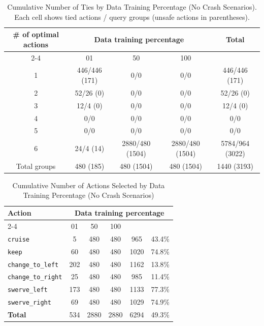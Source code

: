 \documentclass{article}
\begin{document}
\begin{table}[h]
\centering
\caption{Cumulative Number of Ties by Data Training Percentage (No Crash Scenarios).
Each cell shows tied actions / query groups (unsafe actions in parentheses).}
\begin{tabular}{c|ccc|c}
\toprule
\multirow{2}{*}{\# of optimal actions} & \multicolumn{3}{c|}{Data training percentage} & \multirow{2}{*}{Total} \\
\cmidrule{2-4}
 & 01 & 50 & 100 & \\
\midrule
1 & 446/446 (171) & 0/0 & 0/0 & 446/446 (171) \\ 
2 & 52/26 (0) & 0/0 & 0/0 & 52/26 (0) \\ 
3 & 12/4 (0) & 0/0 & 0/0 & 12/4 (0) \\ 
4 & 0/0 & 0/0 & 0/0 & 0/0 \\ 
5 & 0/0 & 0/0 & 0/0 & 0/0 \\ 
6 & 24/4 (14) & 2880/480 (1504) & 2880/480 (1504) & 5784/964 (3022) \\ 
\midrule
Total groups & 480 (185) & 480 (1504) & 480 (1504) & 1440 (3193) \\ 
\bottomrule
\end{tabular}
\end{table}

\begin{table}[h]
\centering
\caption{Cumulative Number of Actions Selected by Data Training Percentage (No Crash Scenarios)}
\begin{tabular}{l|ccc|c|c}
\toprule
\multirow{2}{*}{Action} & \multicolumn{5}{c|}{Data training percentage} & \multirow{2}{*}{Total} & \multirow{2}{*}{Safe (\%)} \\
\cmidrule{2-4}
 & 01 & 50  & 100 & & \\
\midrule
\texttt{cruise} & 5 & 480 & 480 & 965 & 43.4\% \\ 
\texttt{keep} & 60 & 480 & 480 & 1020 & 74.8\% \\ 
\texttt{change\_to\_left} & 202 & 480 & 480 & 1162 & 13.8\% \\ 
\texttt{change\_to\_right} & 25 & 480 & 480 & 985 & 11.4\% \\ 
\texttt{swerve\_left} & 173 & 480 & 480 & 1133 & 77.3\% \\ 
\texttt{swerve\_right} & 69 & 480 & 480 & 1029 & 74.9\% \\ 
\midrule
\textbf{Total} & 534 & 2880 & 2880 & 6294 & 49.3\% \\ 
\bottomrule
\end{tabular}
\end{table}
\end{document}
